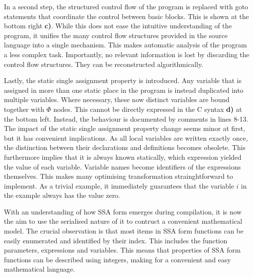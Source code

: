     In a second step, the structured control flow of the program is replaced
    with goto statements that coordinate the control between basic blocks.
    This is shown at the bottom right {\bf c)}.
    While this does not ease the intuitive understanding of the program, it
    unifies the many control flow structures provided in the source language
    into a single mechanism.
    This makes automatic analysis of the program a less complex task.
    Importantly, no relevant information is lost by discarding the control flow
    structures.
    They can be reconstructed algorithmically.

    Lastly, the static single assignment property is introduced.
    Any variable that is assigned in more than one static place in the program
    is instead duplicated into multiple variables.
    Where necessary, these now distinct variables are bound together with
    $\Phi$ nodes.
    This cannot be directly expressed in the C syntax {\bf d)} at the bottom
    left.
    Instead, the behaviour is documented by comments in lines 8-13.
    The impact of the static single assignment property change seems minor
    at first, but it has convenient implications.
    As all local variables are written exactly once, the distinction between
    their declarations and definitions becomes obsolete.
    This furthermore implies that it is always known statically, which
    expression yielded the value of each variable.
    Variable names become identifiers of the expressions themselves.
    This makes many optimising transformation strainghtforward to implement.
    As a trivial example, it immediately guarantees that the variable $i$ in the
    example always has the value zero.

    With an understanding of how SSA form emerges during compilation, it is now
    the aim to use the serialised nature of it to contruct a convenient
    mathematical model.
    The crucial observation is that most items in SSA form functions can be
    easily enumerated and identified by their index.
    This includes the function parameters, expressions and variables.
    This means that properties of SSA form functions can be described using
    integers, making for a convenient and easy mathematical language.

